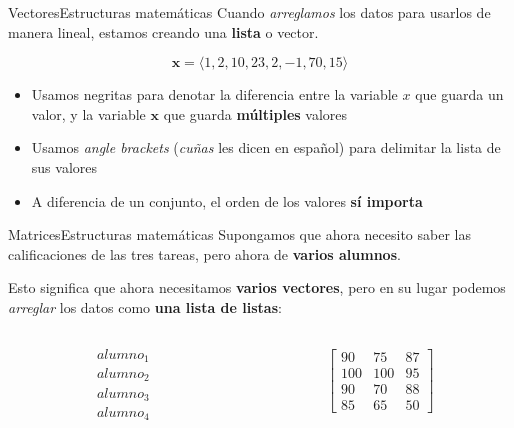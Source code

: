 \documentclass[spanish, c]{beamer}
\begin{document}
\begin{frame}{Vectores}{Estructuras matemáticas}
    Cuando \textit{arreglamos} los datos para usarlos de manera lineal, estamos creando una \textbf{lista} o \alert{vector}. \pause

    $$\mathbf{x} = \langle 1, 2, 10, 23, 2, -1, 70, 15\rangle$$

    \begin{itemize}[<+->]
        \item Usamos negritas para denotar la diferencia entre la variable $x$ que guarda un valor, y la variable $\mathbf{x}$ que guarda \textbf{múltiples} valores
        \item Usamos \textit{angle brackets} (\textit{cuñas} les dicen en español) para delimitar la lista de sus valores
        \item A diferencia de un conjunto, el orden de los valores \textbf{sí importa}
    \end{itemize}

\end{frame}

\begin{frame}{Matrices}{Estructuras matemáticas}
    Supongamos que ahora necesito saber las calificaciones de las tres tareas, pero ahora de \textbf{varios alumnos}.

    Esto significa que ahora necesitamos \textbf{varios vectores}, pero en su lugar podemos \textit{arreglar} los datos como \textbf{una lista de listas}: \pause

    \begin{columns}
        \begin{column}{0.5\textwidth}
            \begin{align*}
                & alumno_1 \\
                & alumno_2 \\
                & alumno_3 \\
                & alumno_4
            \end{align*}
        \end{column}

        \begin{column}{0.5\textwidth}
            \begin{align*}
                \begin{bmatrix}
                    90 & 75 & 87 \\
                    100 & 100 & 95 \\
                    90 & 70 & 88 \\
                    85 & 65 & 50
                \end{bmatrix}
            \end{align*}
        \end{column}
    \end{columns}
\end{frame}
\end{document}
